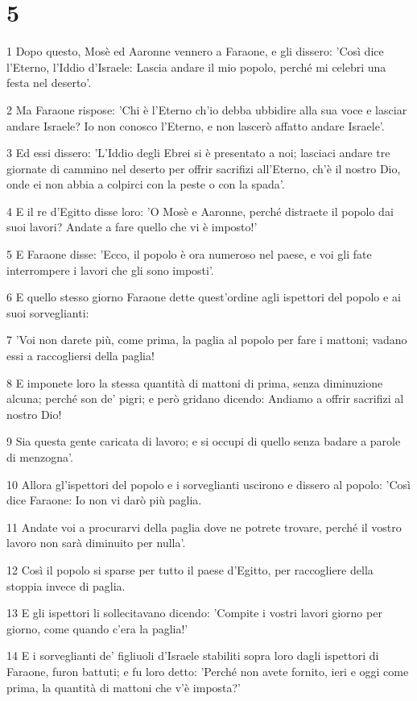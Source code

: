 \chapter{5}

\par 1 Dopo questo, Mosè ed Aaronne vennero a Faraone, e gli dissero: 'Così dice l'Eterno, l'Iddio d'Israele: Lascia andare il mio popolo, perché mi celebri una festa nel deserto'.
\par 2 Ma Faraone rispose: 'Chi è l'Eterno ch'io debba ubbidire alla sua voce e lasciar andare Israele? Io non conosco l'Eterno, e non lascerò affatto andare Israele'.
\par 3 Ed essi dissero: 'L'Iddio degli Ebrei si è presentato a noi; lasciaci andare tre giornate di cammino nel deserto per offrir sacrifizi all'Eterno, ch'è il nostro Dio, onde ei non abbia a colpirci con la peste o con la spada'.
\par 4 E il re d'Egitto disse loro: 'O Mosè e Aaronne, perché distraete il popolo dai suoi lavori? Andate a fare quello che vi è imposto!'
\par 5 E Faraone disse: 'Ecco, il popolo è ora numeroso nel paese, e voi gli fate interrompere i lavori che gli sono imposti'.
\par 6 E quello stesso giorno Faraone dette quest'ordine agli ispettori del popolo e ai suoi sorveglianti:
\par 7 'Voi non darete più, come prima, la paglia al popolo per fare i mattoni; vadano essi a raccogliersi della paglia!
\par 8 E imponete loro la stessa quantità di mattoni di prima, senza diminuzione alcuna; perché son de' pigri; e però gridano dicendo: Andiamo a offrir sacrifizi al nostro Dio!
\par 9 Sia questa gente caricata di lavoro; e si occupi di quello senza badare a parole di menzogna'.
\par 10 Allora gl'ispettori del popolo e i sorveglianti uscirono e dissero al popolo: 'Così dice Faraone: Io non vi darò più paglia.
\par 11 Andate voi a procurarvi della paglia dove ne potrete trovare, perché il vostro lavoro non sarà diminuito per nulla'.
\par 12 Così il popolo si sparse per tutto il paese d'Egitto, per raccogliere della stoppia invece di paglia.
\par 13 E gli ispettori li sollecitavano dicendo: 'Compite i vostri lavori giorno per giorno, come quando c'era la paglia!'
\par 14 E i sorveglianti de' figliuoli d'Israele stabiliti sopra loro dagli ispettori di Faraone, furon battuti; e fu loro detto: 'Perché non avete fornito, ieri e oggi come prima, la quantità di mattoni che v'è imposta?'
